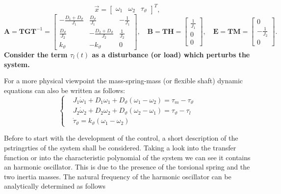 \documentclass[12pt,a4paper]{scrartcl}
\begin{document}
\begin{onehalfspace}
\begin{mybox}
	\begin{equation*}
		\vec{x} = \left[\begin{matrix} \omega_1 & \omega_2 & \tau_{\vartheta} 
		\end{matrix} \right]^T,
	\end{equation*}
	\begin{equation*}
		{\mathbf{A}} = \mathbf{T}{\mathbf{G}}\mathbf{T}^{-1} =
		\left[ \begin{matrix}
			-\frac{D_1 + D_{\vartheta}}{J_1} & \frac{D_{\vartheta}}{J_1} & 
			-\frac{1}{J_1}\\[6pt]
			\frac{D_{\vartheta}}{J_2} & -\frac{D_2 + D_{\vartheta}}{J_2} & 
			\frac{1}{J_2}\\[6pt]
			k_{\vartheta} & -k_{\vartheta} & 0
		\end{matrix}\right], \quad
		{\mathbf{B}} = \mathbf{T}{\mathbf{H}} =
		\left[ \begin{matrix}
			\frac{1}{J_1} \\[6pt]
			0 \\[6pt]
			0
		\end{matrix}\right],
		\quad
		{\mathbf{E}} = \mathbf{T}{\mathbf{M}} =
		\left[ \begin{matrix}
			0 \\[6pt]
			-\frac{1}{J_2} \\[6pt]
			0
		\end{matrix}\right].
	\end{equation*}
	\textbf{Consider the term $\tau_l(t)$ as a disturbance (or load) which perturbs 
		the system.}
	
	\vspace{5mm}
	For a more physical viewpoint the mass-spring-mass (or flexible shaft) dynamic 
	equations can also be written as follows:
	\begin{equation}
		\left\lbrace 
		\begin{aligned}
			& J_1 \dot{\omega}_1 + D_1\omega_1 + D_{\vartheta}(\omega_1 - \omega_2) = \tau_m 
			- \tau_{\vartheta} \\[6pt]
			& J_2 \dot{\omega}_2 + D_2\omega_2 + D_{\vartheta}(\omega_2 - \omega_1) = 
			\tau_{\vartheta} - \tau_l \\[6pt]
			& \dot{\tau}_{\vartheta} = k_{\vartheta}\left( \omega_1 - \omega_2\right) 
		\end{aligned}
		\right. 
	\end{equation}
\end{mybox}

Before to start with the development of the control, a short description of the pstringrties of the system shall be considered. Taking a look into the transfer function or into the characteristic polynomial of the system we can see it contains an harmonic oscillator. This is due to the presence of the torsional spring and the two inertia masses. The natural frequency of the harmonic oscillator can be analytically determined as follows


\end{onehalfspace}
\end{document}

